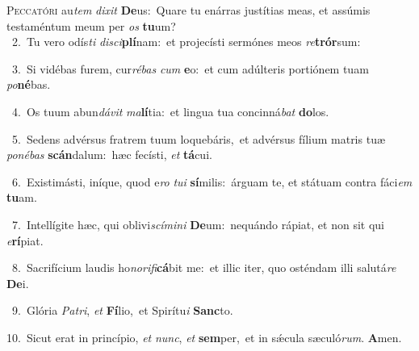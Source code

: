 \lettrine{\initial\textcolor{\initialcolor}{P}}{eccatóri} au\textit{tem} \textit{di}\-\textit{xit} \textbf{De}\-us:~\star Quare tu enárras justítias meas, et assúmis testaméntum meum per \textit{os} \textbf{tu}\-um?\\
{\numbfont\textcolor{\numbcolor}{~2.}}~Tu vero odís\textit{ti} \textit{di}\-\textit{sci}\textbf{plí}nam:~\star et projecísti sermónes meos \textit{re}\-\textbf{trór}sum:\par
{\numbfont\textcolor{\numbcolor}{~3.}}~Si vidébas furem, cur\-\textit{ré}\-\textit{bas} \textit{cum} \textbf{e}\-o:~\star et cum adúlteris portiónem tuam \textit{po}\-\textbf{né}bas.\par
{\numbfont\textcolor{\numbcolor}{~4.}}~Os tuum abun\-\textit{dá}\-\textit{vit} \textit{ma}\-\textbf{lí}tia:~\star et lingua tua concinná\textit{bat} \textbf{do}\-los.\par
{\numbfont\textcolor{\numbcolor}{~5.}}~Sedens advérsus fratrem tuum loquebáris,~\dagger et advérsus fílium matris tuæ \textit{po}\-\textit{né}\textit{bas} \textbf{scán}\-dalum:~\star hæc fecísti, \textit{et} \textbf{tá}\-cui.\par
{\numbfont\textcolor{\numbcolor}{~6.}}~Existimásti, iníque, quod e\textit{ro} \textit{tu}\-\textit{i} \textbf{sí}\-milis:~\star árguam te, et státuam contra fáci\textit{em} \textbf{tu}\-am.\par
{\numbfont\textcolor{\numbcolor}{~7.}}~Intellígite hæc, qui oblivi\-\textit{scí}\-\textit{mi}\textit{ni} \textbf{De}\-um:~\star nequándo rápiat, et non sit qui \textit{e}\-\textbf{rí}piat.\par
{\numbfont\textcolor{\numbcolor}{~8.}}~Sacrifícium laudis ho\-\textit{no}\-\textit{ri}\textit{fi}\textbf{cá}bit me:~\star et illic iter, quo osténdam illi salutá\textit{re} \textbf{De}\-i.\par
{\numbfont\textcolor{\numbcolor}{~9.}}~Glória \textit{Pa}\-\textit{tri}, \textit{et} \textbf{Fí}\-lio,~\star et Spirítu\textit{i} \textbf{Sanc}\-to.\par
{\numbfont\textcolor{\numbcolor}{10.}}~Sicut erat in princípio, \textit{et} \textit{nunc}\-, \textit{et} \textbf{sem}\-per,~\star et in sǽcula sæculó\-\textit{rum}\-. \textbf{A}\-men.\par
